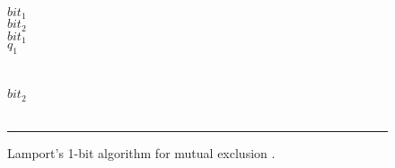 \begin{figure}[t]
\begin{minipage}[t]{.44\columnwidth}
    \tabTT \algIf $bit_1$ \algThen \\
    \tabTTT $bit_2$ \algAssgn \mathfalse \\
    \tabTTT \algWhile $bit_1$ \algDo \algSkip \algOd \\
    \tabTTT \algGoto $q_1$ \\
    \tabTT \algFi \\
    \tabTT {} \\
    \tabTT $bit_2$ \algAssgn \mathfalse \\
    \tabT \algOd \\
    \algEnd
  \end{minipage}
  \vspace{1.5ex}
  \hrule
  \caption{Lamport's 1-bit algorithm for mutual exclusion
    \cite{LamportJACM86}.}
  \label{fig_lamport_src}
\end{figure}


